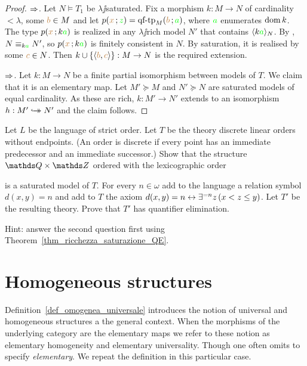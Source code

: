 \documentclass[creche.tex]{subfiles}
\begin{document}
\begin{proof}$\Rightarrow$. Let $N\models T_1$ be $\lambda\jj$saturated. Fix a morphism $k:M\to N$ of cardinality $<\lambda$, some ${\color{brown} b}\in M$ and let $p({\color{brown} x}\,;{\color{green} z})=\textrm{qf\mbox{-}tp}_M({\color{brown} b}\,;{\color{green} a})$, where ${\color{green} a}$ enumerates $\mathop{\rm dom} k$. The type $p({\color{brown} x}\,;k{\color{green} a})$ is realized in any $\lambda\jj$rich model $N'$ that contains $\langle k{\color{green} a}\rangle_N$. By , $N\equiv_{k{\color{green} a}} N'$, so $p({\color{brown} x}\,;k{\color{green} a})$ is finitely consistent in $N$.  By saturation, it is realised by some ${\color{brown} c}\in N$. Then $k\cup \{\langle{\color{brown}b},{\color{brown} c}\rangle\}:M\to N$ is the required extension.


$\Rightarrow$. Let $k:M\to N$ be a finite partial isomorphism between models of $T$. We claim that it is an elementary map. Let $M'\succeq M$ and $N'\succeq N$ are saturated models of equal cardinality. As these are rich, $k:M'\to N'$ extends to an isomorphism $h:M'\hookrightarrow\mathrel{\mspace{-15mu}}\rightarrow N'$ and the claim follows.
\end{proof}

\begin{exercise}\label{ex_QQxZZ_saturo}
Let $L$ be the language of strict order. Let $T$ be the theory discrete linear orders without endpoints. (An order is discrete if every point has an immediate predecessor and an immediate successor.) Show that the structure $\QQ\times\ZZ$ ordered with the lexicographic order 


is a saturated model of $T$. For every $n\in\omega$ add to the language a relation symbol $d(x,y)=n$ and add to $T$ the axiom $d(x,y)=n\leftrightarrow\exists^{=n} z\,(x<z\le y)$.   Let $T'$ be the resulting theory. Prove that $T'$ has quantifier elimination. 

Hint: answer the second question first using Theorem~\ref{thm_ricchezza_saturazione_QE}.\QED 
\end{exercise}


\section{Homogeneous structures}\label{homogeneous}
Definition~\ref{def_omogenea_universale} introduces the notion of universal and homogeneous structures a the general context. When the morphisms of the underlying category are the elementary maps we refer to these notion as elementary homogeneity and elementary universality. Though one often omits to specify \textit{elementary}. We repeat the definition in this particular case. 
\end{document}
